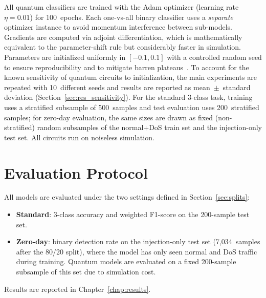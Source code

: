All quantum classifiers are trained with the Adam optimizer (learning rate $\eta = 0.01$) for 100~epochs. Each one-vs-all binary classifier uses a \emph{separate} optimizer instance to avoid momentum interference between sub-models. Gradients are computed via adjoint differentiation, which is mathematically equivalent to the parameter-shift rule but considerably faster in simulation. Parameters are initialized uniformly in $[-0.1, 0.1]$ with a controlled random seed to ensure reproducibility and to mitigate barren plateaus~\cite{mcclean2018barren}. To account for the known sensitivity of quantum circuits to initialization, the main experiments are repeated with 10~different seeds and results are reported as mean~$\pm$~standard deviation (Section~\ref{sec:res_sensitivity}). For the standard 3-class task, training uses a stratified subsample of 500~samples and test evaluation uses 200~stratified samples; for zero-day evaluation, the same sizes are drawn as fixed (non-stratified) random subsamples of the normal+DoS train set and the injection-only test set. All circuits run on noiseless simulation.

\section{Evaluation Protocol}
\label{sec:eval_protocol}

All models are evaluated under the two settings defined in Section~\ref{sec:splits}:
\begin{itemize}[nosep]
    \item \textbf{Standard}: 3-class accuracy and weighted F1-score on the 200-sample test set.
    \item \textbf{Zero-day}: binary detection rate on the injection-only test set (7,034~samples after the 80/20 split), where the model has only seen normal and DoS traffic during training. Quantum models are evaluated on a fixed 200-sample subsample of this set due to simulation cost.
\end{itemize}
Results are reported in Chapter~\ref{chap:results}.
